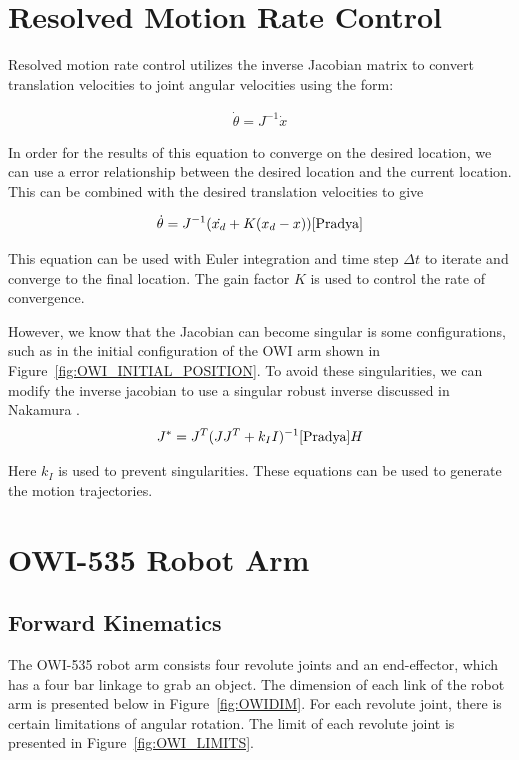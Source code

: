 \documentclass[paper=letter, fontsize=10pt]{scrartcl}	%
\numberwithin{equation}{section}															%
\numberwithin{figure}{section}																%
\numberwithin{table}{section}																%
\begin{document}
\section{Resolved Motion Rate Control}
\label{sec:RMRC}

Resolved motion rate control utilizes the inverse Jacobian matrix to convert translation velocities to joint angular velocities using the form:

\begin{align}
\dot{\theta}=J^{-1}\dot{x}
\end{align}

In order for the results of this equation to converge on the desired location, we can use a error relationship between the desired location and the current location. This can be combined with the desired translation velocities to give

\begin{align}
\dot{\theta}=J^{-1}(\dot{x_d}+K(x_d-x))
\cite{Pradya}
\end{align}

This equation can be used with Euler integration and time step $\Delta t$ to iterate and converge to the final location. The gain factor $K$ is used to control the rate of convergence.

However, we know that the Jacobian can become singular is some configurations, such as in the initial configuration of the OWI arm shown in Figure~\ref{fig:OWI_INITIAL_POSITION}. To avoid these singularities, we can modify the inverse jacobian to use a singular robust inverse discussed in Nakamura \cite{nakamura1986inverse}.
\begin{align}
J^*=J^T(J J^T+k_I I)^{-1}
\cite{Pradya}
H\end{align}

Here $k_I$ is used to prevent singularities. These equations can be used to generate the motion trajectories. 

\section{OWI-535 Robot Arm}
\subsection{Forward Kinematics}

The OWI-535 robot arm consists four revolute joints and an end-effector, which has a four bar linkage to grab an object. The dimension of each link of the robot arm is presented below in Figure~\ref{fig:OWIDIM}. For each revolute joint, there is certain limitations of angular rotation. The limit of each revolute joint is presented in Figure~\ref{fig:OWI_LIMITS}.
\end{document}
